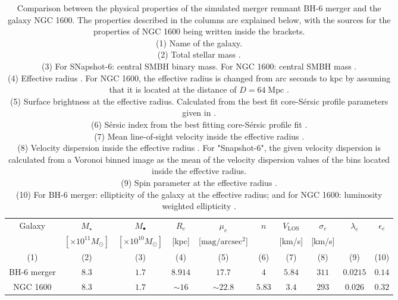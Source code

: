 \documentclass[english, oneside]{HYgradu}
\begin{document}
\begin{table}
	\begin{center}
		\scriptsize
		\begin{tabular}{c c c c c c c c c c}
		\hline
		\hline
		Galaxy & $M_\star$ & $M_\bullet$ & $R_e$ & $\mu_e$ & $n$ & 
		$V_\mathrm{LOS}$ & $\sigma_e$ & $\lambda_e$ &
		$\epsilon_e$ \\
		& $[\times 10^{11} M_\odot]$ & $[\times 10^{10} M_\odot]$ &
		[kpc] & [$\mathrm{mag/arcsec^2}$] & & [km/s] & [km/s] & & \\
		(1) & (2) & (3) & (4) & (5) & (6) & (7) & (8) & (9) & (10) \\
		\hline
		BH-6 merger & $8.3$ & $1.7$ & $8.914$ & $17.7$ & $4$ & $5.84$ & $311$ & $0.0215$ & $0.14$ \\
		NGC 1600 & $8.3$ & $1.7$ & $\sim 16$ & $\sim 22.8$ & $5.83$ & $3.4$ & 
		$293$ & $0.026$ & $0.32$ \\
		\hline
		\end{tabular}
	\end{center}
	\caption{Comparison between the physical properties of the simulated merger remnant BH-6 merger and the galaxy NGC 1600. The properties described in the columns are explained below, with the sources for the properties of NGC 1600 being written inside the brackets. \\
	(1) Name of the galaxy. \\
	(2) Total stellar mass \citep{Thomas2016}. \\
	(3) For SNapshot-6: central SMBH binary mass. For NGC 1600: central SMBH mass \citep{Thomas2016}. \\
	(4) Effective radius \citep{Thomas2016}. For NGC 1600, the effective radius is changed from arc seconds to kpc by assuming that it is located at the distance of $D = 64 \; \mathrm{Mpc}$ \citep{Thomas2016}. \\
	(5) Surface brightness at the effective radius. Calculated from the best fit core-Sérsic profile parameters given in \cite{Thomas2016}. \\
	(6) Sérsic index from the best fitting core-Sérsic profile fit \citep{Thomas2016}. \\
	(7) Mean line-of-sight velocity inside the effective radius \citep{Bender1994}. \\
	(8) Velocity dispersion inside the effective radius \citep{Veale2017veldisp}. For "Snapshot-6", the given velocity dispersion is calculated from a Voronoi binned image as the mean of the velocity dispersion values of the bins located inside the effective radius. \\
	(9) Spin parameter at the effective radius \citep{Veale2018lambda}. \\
	(10) For BH-6 merger: ellipticity of the galaxy at the effective radius; and for NGC 1600: luminosity weighted ellipticity \citep{Goullaud2018}.
	}
	\label{table:snap6_vs_NGC1600}
\end{table}
\end{document}
